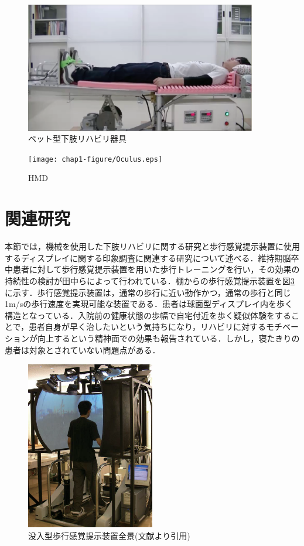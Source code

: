 \begin{figure}[tbp]
	\centering
			\includegraphics[width=0.9\textwidth]{chap1-figure/tadouhoku.eps}
	\caption{ベット型下肢リハビリ器具}
	\label{fig:tadouhokou}
\end{figure}

\begin{figure}[tbp]
	\centering
			\texttt{[image: chap1-figure/Oculus.eps]}
	\caption{HMD}
	\label{fig:Oculus}
\end{figure}
\fi

\section{関連研究}

本節では，機械を使用した下肢リハビリに関する研究と歩行感覚提示装置に使用するディスプレイに関する印象調査に関連する研究について述べる．維持期脳卒中患者に対して歩行感覚提示装置を用いた歩行トレーニングを行い，その効果の持続性の検討\cite{筑波歩行感覚提示}が田中らによって行われている．棚からの歩行感覚提示装置を図\ref{fig:tukuba}に示す．歩行感覚提示装置は，通常の歩行に近い動作かつ，通常の歩行と同じ1m/sの歩行速度を実現可能な装置である．患者は球面型ディスプレイ内を歩く構造となっている．入院前の健康状態の歩幅で自宅付近を歩く疑似体験をすることで，患者自身が早く治したいという気持ちになり，リハビリに対するモチベーションが向上するという精神面での効果も報告されている．しかし，寝たきりの患者は対象とされていない問題点がある．
\fi

\begin{figure}[tbp]
	\centering
			\includegraphics[width=0.5\textwidth]{chap1-figure/tukuba.eps}
	\caption{没入型歩行感覚提示装置全景(文献\cite{筑波歩行感覚提示画像}より引用)}
	\label{fig:tukuba}
\end{figure}


